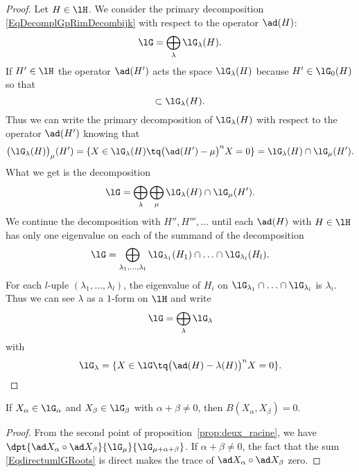 \begin{proof}
	Let \( H\in\lH\). We consider the primary decomposition \eqref{EqDecomplGpRimDecombijk} with respect to the operator \( \ad(H)\):
	\begin{equation}
		\lG=\bigoplus_{\lambda}\lG_{\lambda}(H).
	\end{equation}
	If \( H'\in\lH\) the operator \( \ad(H')\) acts the space \( \lG_{\lambda}(H)\) because \( H'\in\lG_0(H)\) so that
	\begin{equation}
		[H',\lG_{\lambda}(H)]\subset\lG_{\lambda}(H).
	\end{equation}
	Thus we can write the primary decomposition of \( \lG_{\lambda}(H)\) with respect to the operator \( \ad(H')\) knowing that
	\begin{equation}
		\big( \lG_{\lambda}(H) \big)_{\mu}(H')=\{ X\in\lG_{\lambda}(H)\tq\big( \ad(H')-\mu \big)^nX=0 \}=\lG_{\lambda}(H)\cap\lG_{\mu}(H').
	\end{equation}
	What we get is the decomposition
	\begin{equation}
		\lG=\bigoplus_{\lambda}\bigoplus_{\mu}\lG_{\lambda}(H)\cap\lG_{\mu}(H').
	\end{equation}
	We continue the decomposition with \( H'',H''',\ldots\) until each \( \ad(H)\) with \( H\in\lH\) has only one eigenvalue on each of the summand of the decomposition
	\begin{equation}
		\lG=\bigoplus_{\lambda_1,\ldots,\lambda_l}\lG_{\lambda_1}(H_1)\cap\ldots\cap\lG_{\lambda_l}(H_l).
	\end{equation}
	For each \( l\)-uple \( (\lambda_1,\ldots,\lambda_l)\), the eigenvalue of \( H_i\) on \( \lG_{\lambda_1}\cap\ldots\cap\lG_{\lambda_l}\) is \( \lambda_i\). Thus we can see \( \lambda\) as a \( 1\)-form on \( \lH\) and write
	\begin{equation}        \label{EqdirectumlGRoots}
		\lG=\bigoplus_{\lambda}\lG_{\lambda}
	\end{equation}
	with
	\begin{equation}
		\lG_{\lambda}=\{ X\in\lG\tq\big( \ad(H)-\lambda(H) \big)^nX=0 \}.
	\end{equation}
\end{proof}

\begin{corollary}\label{cor:Bxy_zero}
	If $X_{\alpha}\in\lG_{\alpha}$ and $X_{\beta}\in\lG_{\beta}$ with $\alpha+\beta\neq 0$, then $B(X_{\alpha},X_{\beta})=0$.
\end{corollary}

\begin{proof}
	From the second point of proposition~\ref{prop:deux_racine}, we have $\dpt{\ad X_{\alpha}\circ\ad X_{\beta}}{\lG_{\mu}}{\lG_{\mu+\alpha+\beta}}$. If $\alpha+\beta\neq 0$, the fact that the sum \eqref{EqdirectumlGRoots} is direct makes the trace of $\ad X_{\alpha}\circ\ad X_{\beta}$ zero.
\end{proof}



